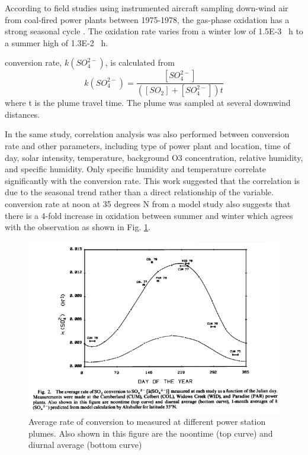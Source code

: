 According to field studies using instrumented aircraft sampling down-wind air from coal-fired power plants between 1975-1978, the gas-phase  oxidation has a strong seasonal cycle \cite{meagherSeasonalVariationAtmospheric1983}. The oxidation rate varies from a winter low of \num{1.5E-3} \unit{\per\hour} to a summer high of \num{1.3E-2} \unit{\per\hour}. 

conversion rate, $k(SO_4^{2-})$, is calculated from
\begin{equation}
k(SO_4^{2-}) = \frac{[SO_4^{2-}]}{([SO_2]+[SO_4^{2-}])t}
\end{equation}
where t is the plume travel time. The plume was sampled at several downwind distances.

In the same study, correlation analysis was also performed between conversion rate and other parameters, including type of power plant and location, time of day, solar intensity, temperature, background O3 concentration, relative humidity, and specific humidity. Only specific humidity and temperature correlate significantly with the conversion rate. This work suggested that the correlation is due to the seasonal trend rather than a direct relationship of the variable.  conversion rate at noon at 35 degrees N from a model study also suggests that there is a 4-fold increase in  oxidation between summer and winter which agrees with the observation as shown in Fig. \ref{fig:ch4:meagher1983}.

\begin{figure}
    \centering
    \includegraphics[width=0.7\linewidth]{Chapter4/Figs/meagher1983.png}
    \caption{Average rate of  conversion to  measured at different power station plumes. Also shown in this figure are the noontime (top curve) and diurnal average (bottom curve) \cite{meagherSeasonalVariationAtmospheric1983}}
    \label{fig:ch4:meagher1983}
\end{figure}

